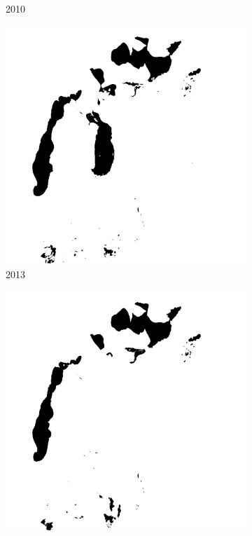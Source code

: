 \documentclass[12pt,a4paper]{article}
\begin{document}
\begin{figure}
\begin{subfigure}[b]{0.19\textwidth}
        \caption{2010}
    \end{subfigure}
    \begin{subfigure}[b]{0.19\textwidth}
        \centering
        \includegraphics[width=\textwidth]{../img/2013w.jpg}
        \caption{2013}
    \end{subfigure}
    \begin{subfigure}[b]{0.19\textwidth}
        \centering
        \includegraphics[width=\textwidth]{../img/2014w.jpg}

\end{subfigure}
\end{figure}
\end{document}
